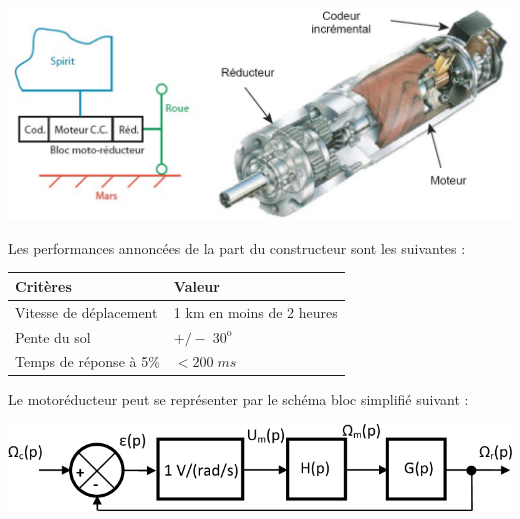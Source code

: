 \documentclass[10pt,fleqn]{article} %
\begin{document}
\begin{multicols}{2}
\begin{center}
\includegraphics[width=.9\linewidth]{images/fig_02}
\end{center}



Les performances annoncées de la part du constructeur sont les suivantes : 
 
\begin{center}
\begin{tabular}{|l|l|}
\hline
Critères & Valeur \\
\hline
\hline
Vitesse de déplacement & 1 km en moins de 2 heures\\
\hline
Pente du sol & $+/- \;  30^{\text{o}}$ \\
\hline
Temps de réponse à 5\% & $<200\; ms$ \\
\hline
\end{tabular}
\end{center}


Le motoréducteur peut se représenter par le schéma bloc simplifié suivant : 
\begin{center}
\includegraphics[width=\linewidth]{images/fig_03}
\end{center}


\end{multicols}
\end{document}

